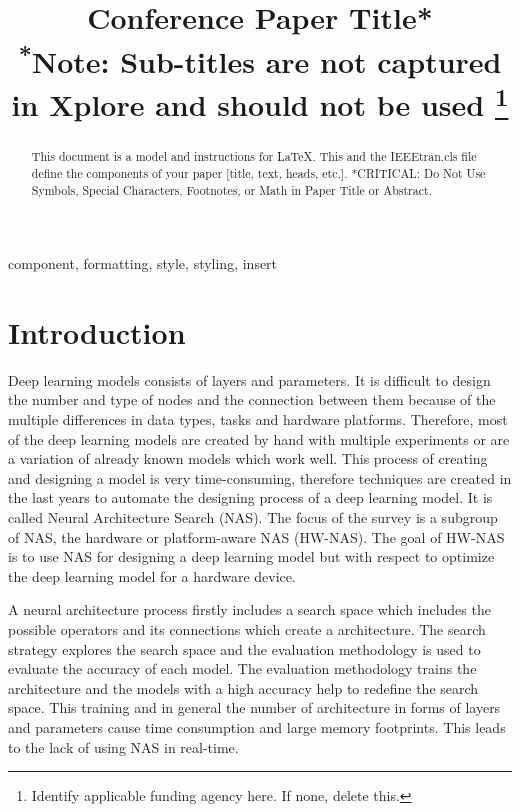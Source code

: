 \documentclass[conference]{IEEEtran}
\begin{document}
\title{Conference Paper Title*\\
{\footnotesize \textsuperscript{*}Note: Sub-titles are not captured in Xplore and
should not be used}
\thanks{Identify applicable funding agency here. If none, delete this.}
}

\author{
}

\maketitle

\begin{abstract}
This document is a model and instructions for \LaTeX.
This and the IEEEtran.cls file define the components of your paper [title, text, heads, etc.]. *CRITICAL: Do Not Use Symbols, Special Characters, Footnotes, 
or Math in Paper Title or Abstract.
\end{abstract}

\begin{IEEEkeywords}
component, formatting, style, styling, insert
\end{IEEEkeywords}

\section{Introduction}
Deep learning models consists of layers and parameters. It is difficult to design the number and type of nodes and the connection between them because of the multiple differences in data types, tasks and hardware platforms. Therefore, most of the deep learning models are created by hand with multiple experiments or are a variation of already known models which work well. This process of creating and designing a model is very time-consuming, therefore techniques are created in the last years to automate the designing process of a deep learning model. It is called Neural Architecture Search (NAS). The focus of the survey is a subgroup of NAS, the hardware or platform-aware NAS (HW-NAS). The goal of HW-NAS is to use NAS for designing a deep learning model but with respect to optimize the deep learning model for a hardware device.  

A neural architecture process firstly includes a search space which includes the possible operators and its connections which create a architecture. The search strategy explores the search space and the evaluation methodology is used to evaluate the accuracy of each model. The evaluation methodology trains the architecture and the models with a high accuracy help to redefine the search space. This training and in general the  number of architecture in forms of layers and parameters cause time consumption and large memory footprints. This leads to the lack of using NAS in real-time. 
\end{document}
